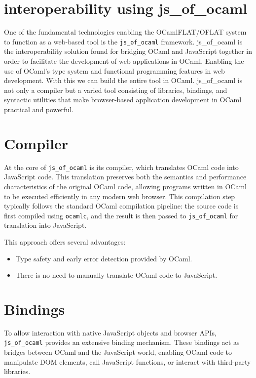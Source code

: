 \section{interoperability using js\_of\_ocaml}

One of the fundamental technologies enabling the OCamlFLAT/OFLAT system to function as a web-based tool is the \texttt{js\_of\_ocaml} framework. 
js\_of\_ocaml\cite{js-of-ocaml-manual} is the interoperability solution found for bridging OCaml and JavaScript together in order to
facilitate the development of web applications in OCaml. Enabling the use of OCaml's type system and functional programming features in web development.
With this we can build the entire tool in OCaml.
js\_of\_ocaml is not only a compiler but a varied tool consisting of libraries, bindings, and syntactic utilities 
that make browser-based application development in OCaml practical and powerful.

\section*{Compiler}

At the core of \texttt{js\_of\_ocaml} is its compiler, which translates OCaml code into JavaScript code. 
This translation preserves both the semantics and performance characteristics of the original OCaml code, 
allowing programs written in OCaml to be executed efficiently in any modern web browser.
This compilation step typically follows the standard OCaml compilation pipeline: 
the source code is first compiled using \texttt{ocamlc}, and the result is then passed to \texttt{js\_of\_ocaml} for translation into JavaScript.

This approach offers several advantages:
\begin{itemize}
  \item Type safety and early error detection provided by OCaml.
  \item There is no need to manually translate OCaml code to JavaScript.
\end{itemize}

\section*{Bindings}

To allow interaction with native JavaScript objects and browser APIs, \texttt{js\_of\_ocaml} provides an extensive binding mechanism. 
These bindings act as bridges between OCaml and the JavaScript world, enabling OCaml code to manipulate DOM elements, call JavaScript functions, 
or interact with third-party libraries.

